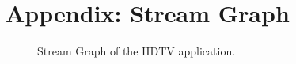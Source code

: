 \documentclass{article}
\begin{document}
\begin{small}


\end{small}


\section{Appendix: Stream Graph}

\begin{figure}
\center
\epsfxsize=4.5in
\caption{Stream Graph of the HDTV application.}
\label{fig:hdtv-stream-graph}
\end{figure}
\end{document}
